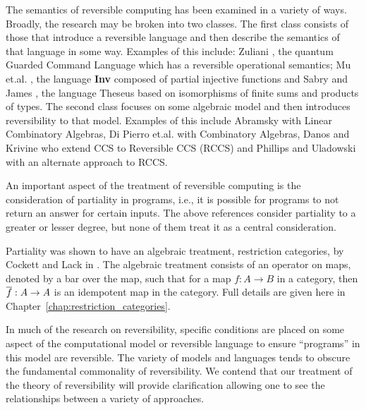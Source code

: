 The semantics of reversible computing has been examined in a variety of ways. Broadly, the research
may be broken into two classes. The first class consists of those that introduce a reversible
language and then describe the semantics of that language in some way. Examples of this include:
Zuliani \cite{zuliani01:reversibility}, the quantum Guarded Command Language which has a reversible
operational semantics; Mu et.al. \cite{muetal04:injreversible}, the language \textbf{Inv} composed
of partial injective functions and Sabry and James \cite{james2014theseus}, the language Theseus
based on isomorphisms of finite sums and products of types. The second class focuses on some
algebraic model and then introduces reversibility to that model. Examples of this include Abramsky
\cite{abramsky05:reversible} with Linear Combinatory Algebras, Di Pierro
et.al. \cite{DiPierro200625} with Combinatory Algebras, Danos and Krivine \cite{danos2004reversible}
who extend CCS\cite{milner1980calculus} to Reversible CCS (RCCS) and Phillips and Uladowski
\cite{phillips2006operational} with an alternate approach to RCCS.


An important aspect of the treatment of reversible computing is the consideration of partiality in
programs, i.e., it is possible for programs to not return an answer for certain inputs. The above
references consider partiality to a greater or lesser degree, but none of them treat it as a central
consideration.

Partiality was shown to have an algebraic treatment, restriction categories, by Cockett and Lack in
\cite{cockett2002:restcategories1,cockettlack2003:restcategories2,cockettlack2004:restcategories3}. The
algebraic treatment consists of an operator on maps, denoted by a bar over the map, such that for a
map $f:A\to B$ in a category, then $\overline{f}:A\to A$ is an idempotent map in the category. Full
details are given here in Chapter~\ref{chap:restriction_categories}.

In much of the research on reversibility, specific conditions are placed on some aspect of the
computational model or reversible language to ensure ``programs'' in this model are reversible.
The variety of models and languages tends to obscure the fundamental commonality of reversibility.
We contend that our treatment of the theory of reversibility will provide clarification allowing one
to see the relationships between a variety of approaches.

